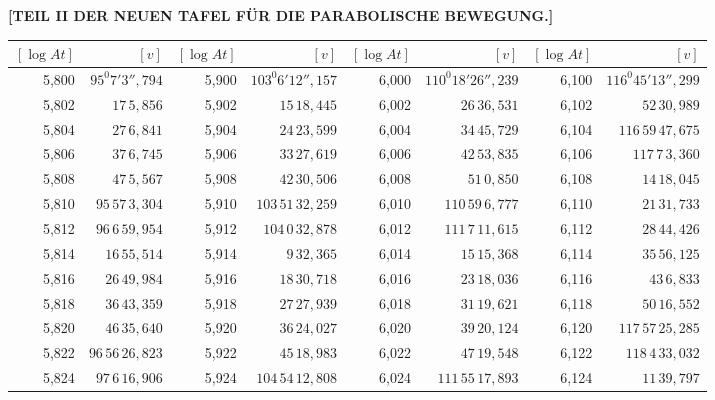 \clearpage
{}
\begingroup
\centering
\fontsize{9}{9}\selectfont
\setlength{\tabcolsep}{1pt}
\renewcommand{\arraystretch}{.9}
\setlength{\parskip}{0pt}
\textbf{[TEIL II DER NEUEN TAFEL FÜR DIE PARABOLISCHE BEWEGUNG.]}
\par\vspace{7pt}
\begin{tabular}{|r|r||r|r||r|r||r|r|}
\hline
\([\log At]\) & \([v]\) & \([\log At]\) & \([v]\) & \([\log At]\) & \([v]\) & \([\log At]\) & \([v]\) \\
\hline
5,800 & \(95^{0}7'3'',\!794\) & 5,900 & \(103^{0}6'12'',\!157\) & 6,000 & \(110^{0}18'26'',\!239\) & 6,100 & \(116^{0}45'13'',\!299\) \\[1pt]
5,802 & \(17\,5,\!856\) & 5,902 & \(15\,18,\!445\) & 6,002 & \(26\,36,\!531\) & 6,102 & \(52\,30,\!989\) \\
5,804 & \(27\,6,\!841\) & 5,904 & \(24\,23,\!599\) & 6,004 & \(34\,45,\!729\) & 6,104 & \(116\,59\,47,\!675\) \\
5,806 & \(37\,6,\!745\) & 5,906 & \(33\,27,\!619\) & 6,006 & \(42\,53,\!835\) & 6,106 & \(117\,7\,3,\!360\) \\
5,808 & \(47\,5,\!567\) & 5,908 & \(42\,30,\!506\) & 6,008 & \(51\,0,\!850\) & 6,108 & \(14\,18,\!045\) \\
5,810 & \(95\,57\,3,\!304\) & 5,910 & \(103\,51\,32,\!259\) & 6,010 & \(110\,59\,6,\!777\) & 6,110 & \(21\,31,\!733\) \\[1pt]
5,812 & \(96\,6\,59,\!954\) & 5,912 & \(104\,0\,32,\!878\) & 6,012 & \(111\,7\,11,\!615\) & 6,112 & \(28\,44,\!426\) \\
5,814 & \(16\,55,\!514\) & 5,914 & \(9\,32,\!365\) & 6,014 & \(15\,15,\!368\) & 6,114 & \(35\,56,\!125\) \\
5,816 & \(26\,49,\!984\) & 5,916 & \(18\,30,\!718\) & 6,016 & \(23\,18,\!036\) & 6,116 & \(43\,6,\!833\) \\
5,818 & \(36\,43,\!359\) & 5,918 & \(27\,27,\!939\) & 6,018 & \(31\,19,\!621\) & 6,118 & \(50\,16,\!552\) \\
5,820 & \(46\,35,\!640\) & 5,920 & \(36\,24,\!027\) & 6,020 & \(39\,20,\!124\) & 6,120 & \(117\,57\,25,\!285\) \\[1pt]
5,822 & \(96\,56\,26,\!823\) & 5,922 & \(45\,18,\!983\) & 6,022 & \(47\,19,\!548\) & 6,122 & \(118\,4\,33,\!032\) \\
5,824 & \(97\,6\,16,\!906\) & 5,924 & \(104\,54\,12,\!808\) & 6,024 & \(111\,55\,17,\!893\) & 6,124 & \(11\,39,\!797\) \\

\end{tabular}
